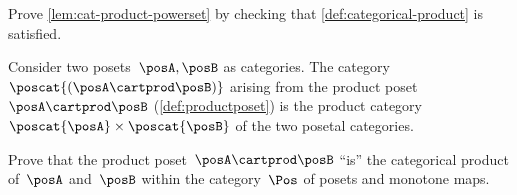 \vfill
\begin{gradedexercise}
    \label{ex:CatProductPowerset}
    Prove \cref{lem:cat-product-powerset} by checking that \cref{def:categorical-product} is satisfied.
\end{gradedexercise}


\begin{example}
    Consider two posets~$\posA,\posB$ as categories.
    The category~$\poscat{(\posA\cartprod \posB)}$ arising from the product poset~$\posA\cartprod \posB$ (\cref{def:productposet}) is the product category~$\poscat{\posA} \times \poscat{\posB}$ of the two posetal categories.
\end{example}

\begin{gradedexercise}
    Prove that the product poset~$\posA \cartprod \posB$ ``is'' the categorical product of~$\posA$ and~$\posB$ within the category~$\Pos$ of posets and monotone maps.
\end{gradedexercise}


